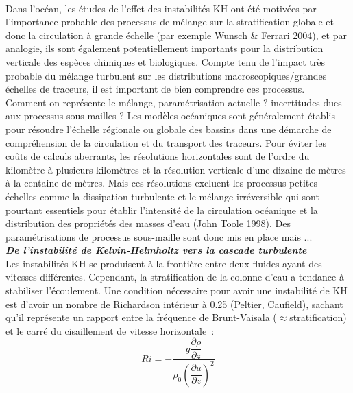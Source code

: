 \documentclass[a4paper,12pt]{article}
\begin{document}
    \\
    Dans l'océan, les études de l'effet des instabilités KH ont été motivées par l'importance probable des processus de mélange sur la stratification globale et donc la circulation à grande échelle (par exemple Wunsch & Ferrari 2004), et par analogie, ils sont également potentiellement importants pour la distribution verticale des espèces chimiques et biologiques. Compte tenu de l'impact très probable du mélange turbulent sur les distributions macroscopiques/grandes échelles de traceurs, il est important de bien comprendre ces processus.
    \\
    Comment on représente le mélange, paramétrisation actuelle ? incertitudes dues aux processus sous-mailles ?
    Les modèles océaniques sont généralement établis pour résoudre l'échelle régionale ou globale des bassins dans une démarche de compréhension de la circulation et du transport des traceurs. Pour éviter les coûts de calculs aberrants, les résolutions horizontales sont de l'ordre du kilomètre à plusieurs kilomètres et la résolution verticale d'une dizaine de mètres à la centaine de mètres. Mais ces résolutions excluent les processus petites échelles comme la dissipation turbulente et le mélange irréversible qui sont pourtant essentiels pour établir l'intensité de la circulation océanique et la distribution des propriétés des masses d'eau (John Toole 1998). Des paramétrisations de processus sous-maille sont donc mis en place mais ... \\
    \newline
    \textbf{\textit{De l'instabilité de Kelvin-Helmholtz vers la cascade turbulente}} \\
    Les instabilités KH se produisent à la frontière entre deux fluides ayant des vitesses différentes. Cependant, la stratification de la colonne d'eau a tendance à stabiliser l'écoulement. Une condition nécessaire pour avoir une instabilité de KH est d'avoir un nombre de Richardson intérieur à 0.25 (Peltier, Caufield), sachant qu'il représente un rapport entre la fréquence de Brunt-Vaisala ($\approx$stratification) et le carré du cisaillement de vitesse horizontale : \\
    \begin{equation}
        \label{Ri}
        Ri = -\frac{g \dfrac{\partial\rho}{\partial z}}{\rho_0 (\dfrac{\partial u}{\partial z})^2}
    \end{equation}
    \\
\end{document}
